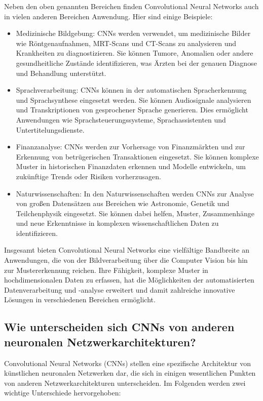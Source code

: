     Neben den oben genannten Bereichen finden Convolutional Neural Networks auch in vielen anderen Bereichen Anwendung. Hier sind einige Beispiele:
    \begin{itemize}
    \item Medizinische Bildgebung: CNNs werden verwendet, um medizinische Bilder wie Röntgenaufnahmen, MRT-Scans und CT-Scans zu analysieren und Krankheiten zu diagnostizieren. Sie können Tumore, Anomalien oder andere gesundheitliche Zustände identifizieren, was Ärzten bei der genauen Diagnose und Behandlung unterstützt.

    \item Sprachverarbeitung: CNNs können in der automatischen Spracherkennung und Sprachsynthese eingesetzt werden. Sie können Audiosignale analysieren und Transkriptionen von gesprochener Sprache generieren. Dies ermöglicht Anwendungen wie Sprachsteuerungssysteme, Sprachassistenten und Untertitelungsdienste.

    \item Finanzanalyse: CNNs werden zur Vorhersage von Finanzmärkten und zur Erkennung von betrügerischen Transaktionen eingesetzt. Sie können komplexe Muster in historischen Finanzdaten erkennen und Modelle entwickeln, um zukünftige Trends oder Risiken vorherzusagen.

    \item Naturwissenschaften: In den Naturwissenschaften werden CNNs zur Analyse von großen Datensätzen aus Bereichen wie Astronomie, Genetik und Teilchenphysik eingesetzt. Sie können dabei helfen, Muster, Zusammenhänge und neue Erkenntnisse in komplexen wissenschaftlichen Daten zu identifizieren.

    \end{itemize}
    
    Insgesamt bieten Convolutional Neural Networks eine vielfältige Bandbreite an Anwendungen, die von der Bildverarbeitung über die Computer Vision bis hin zur Mustererkennung reichen. Ihre Fähigkeit, komplexe Muster in hochdimensionalen Daten zu erfassen, hat die Möglichkeiten der automatisierten Datenverarbeitung und -analyse erweitert und damit zahlreiche innovative Lösungen in verschiedenen Bereichen ermöglicht.
    
\subsection{Wie unterscheiden sich CNNs von anderen neuronalen Netzwerkarchitekturen?}

    Convolutional Neural Networks (CNNs) stellen eine spezifische Architektur von künstlichen neuronalen Netzwerken dar, die sich in einigen wesentlichen Punkten von anderen Netzwerkarchitekturen unterscheiden. 
    Im Folgenden werden zwei wichtige Unterschiede hervorgehoben:

